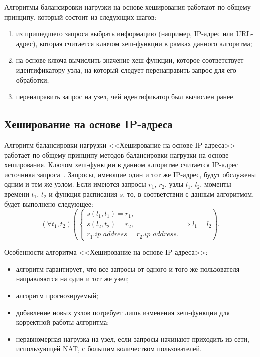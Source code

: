 Алгоритмы балансировки нагрузки на основе хеширования работают по общему принципу, который состоит из следующих шагов:
\begin{enumerate}
	\item из пришедшего запроса выбрать информацию (например, IP-адрес или URL-адрес), которая считается ключом хеш-функции в рамках данного алгоритма;
	\item на основе ключа вычислить значение хеш-функции, которое соответствует идентификатору узла, на который следует перенаправить запрос для его обработки;
	\item перенаправить запрос на узел, чей идентификатор был вычислен ранее.
\end{enumerate}

\subsection*{Хеширование на основе IP-адреса}

Алгоритм балансировки нагрузки <<Хеширование на основе IP-адреса>> работает по общему принципу методов балансировки нагрузки на основе хеширования.
Ключом хеш-функции в данном алгоритме считается IP-адрес источника запроса~\cite{nginx, aws, kemp}.
Запросы, имеющие один и тот же IP-адрес, будут обслужены одним и тем же узлом.
Если имеются запросы $r_1$, $r_2$, узлы $l_1$, $l_2$, моменты времени $t_1$, $t_2$ и функция расписания $s$, то, в соответствии с данным алгоритмом, будет выполнено следующее:
\begin{equation}
	(\forall t_1, t_2) \left(\begin{cases}
		s(l_1, t_1) = r_1, \\
		s(l_2, t_2) = r_2, \\
		r_1.ip\_address = r_2.ip\_address.
	\end{cases} \Rightarrow l_1 = l_2 \right).
\end{equation}

Особенности алгоритма <<Хеширование на основе IP-адреса>>:
\begin{itemize}
	\item алгоритм гарантирует, что все запросы от одного и того же пользователя направляются на один и тот же узел;
	\item алгоритм прогнозируемый; 
	\item добавление новых узлов потребует лишь изменения хеш-функции для корректной работы алгоритма;
	\item неравномерная нагрузка на узел, если запросы начинают приходить из сети, использующей NAT, с большим количеством пользователей.
\end{itemize}

